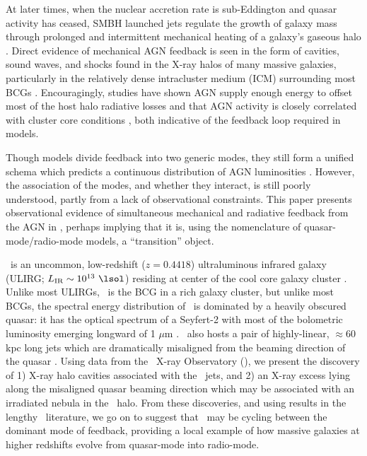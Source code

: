 \documentclass[useAMS,usenatbib]{mn2e}
\begin{document}
At later times, when the nuclear accretion rate is sub-Eddington and
quasar activity has ceased, SMBH launched jets regulate the growth of
galaxy mass through prolonged and intermittent mechanical heating of a
galaxy's gaseous halo \citep{2005MNRAS.363....2K, 2006MNRAS.368....2D,
  mcnamrev}. Direct evidence of mechanical AGN feedback is seen in the
form of cavities, sound waves, and shocks found in the X-ray halos of
many massive galaxies, particularly in the relatively dense
intracluster medium (ICM) surrounding most BCGs
\citep[\eg][]{perseus1, hydraa0, 2001ApJ...554..261C,
  2007ApJ...665.1057F, 2008MNRAS.390L..93S}. Encouragingly, studies
have shown AGN supply enough energy to offset most of the host halo
radiative losses \citep[\eg][]{perseus2, birzan04, dunn06} and that
AGN activity is closely correlated with cluster core conditions
\citep[\eg][]{haradent, rafferty08}, both indicative of the feedback
loop required in models.

Though models divide feedback into two generic modes, they still form
a unified schema \citep[\eg][]{sijacki07} which predicts a continuous
distribution of AGN luminosities
\citep[\eg][]{2009ApJ...698.1550H}. However, the association of the
modes, and whether they interact, is still poorly understood, partly
from a lack of observational constraints. This paper presents
observational evidence of simultaneous mechanical and radiative
feedback from the AGN in \irs, perhaps implying that it is, using the
nomenclature of quasar-mode/radio-mode models, a ``transition''
object.

\irs\ is an uncommon, low-redshift ($z = 0.4418$) ultraluminous
infrared galaxy (ULIRG; $L_{\rm{IR}} \sim 10^{13} ~\lsol$) residing at
center of the cool core galaxy cluster \rxj. Unlike most ULIRGs,
\irs\ is the BCG in a rich galaxy cluster, but unlike most BCGs, the
spectral energy distribution of \irs\ is dominated by a heavily
obscured quasar: it has the optical spectrum of a Seyfert-2 with most
of the bolometric luminosity emerging longward of 1 $\mu$m
\citep{1988ApJ...328..161K, 1993ApJ...415...82H, 1994ApJ...436L..51F,
  1998ApJ...506..205E, 2000A&A...353..910F,
  2001MNRAS.321L..15I}. \irs\ also hosts a pair of highly-linear,
$\approx 60$ kpc long jets which are dramatically misaligned from the
beaming direction of the quasar \citep[][hereafter H93 and H99,
  respectively]{1993ApJ...415...82H, 1999ApJ...512..145H}. Using data
from the \chandra\ X-ray Observatory (\cxo), we present the discovery
of 1) X-ray halo cavities associated with the \irs\ jets, and 2) an
X-ray excess lying along the misaligned quasar beaming direction which
may be associated with an irradiated nebula in the \irs\ halo. From
these discoveries, and using results in the lengthy \irs\ literature,
we go on to suggest that \irs\ may be cycling between the dominant
mode of feedback, providing a local example of how massive galaxies at
higher redshifts evolve from quasar-mode into radio-mode.
\end{document}
